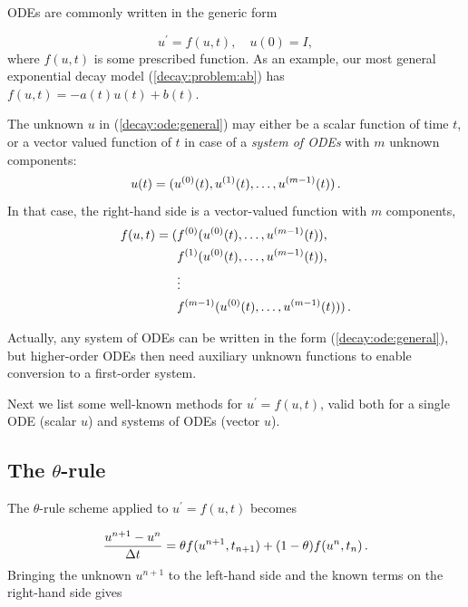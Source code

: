 \documentclass[%
oneside,                 %
final,                   %
10pt]{article}
\begin{document}
ODEs are commonly written in the generic form

\begin{equation}
u^{\prime} = f(u,t),\quad u(0)=I,
\label{decay:ode:general}
\end{equation}
where $f(u,t)$  is some prescribed function.
As an example, our most
general exponential decay model (\ref{decay:problem:ab}) has
$f(u,t)=-a(t)u(t) + b(t)$.

The unknown $u$ in (\ref{decay:ode:general}) may either be
a scalar function of time $t$, or a vector valued function of $t$ in
case of a \emph{system of ODEs} with $m$ unknown components:
\[ u(t) = (u^{(0)}(t),u^{(1)}(t),\ldots,u^{(m-1)}(t)) \thinspace .  \]
In that case, the right-hand side is a vector-valued function with $m$
components,
\begin{align*}
f(u, t) = ( & f^{(0)}(u^{(0)}(t),\ldots,u^{(m-1)}(t)),\\ 
            & f^{(1)}(u^{(0)}(t),\ldots,u^{(m-1)}(t)),\\ 
            & \vdots\\ 
            & f^{(m-1)}(u^{(0)}(t),\ldots,u^{(m-1)}(t)))
\thinspace .
\end{align*}

Actually, any system of ODEs can
be written in the form (\ref{decay:ode:general}), but higher-order
ODEs then need auxiliary unknown functions to enable conversion to
a first-order system.


Next we list some well-known methods for $u^{\prime}=f(u,t)$, valid both for
a single ODE (scalar $u$) and systems of ODEs (vector $u$).


\subsection{The $\theta$-rule}

The $\theta$-rule scheme applied to $u^{\prime}=f(u,t)$ becomes

\begin{equation}
\frac{u^{n+1}-u^n}{\Delta t} = \theta f(u^{n+1},t_{n+1}) +
(1-\theta)f(u^n, t_n)\thinspace .
\label{decay:fd2:theta}
\end{equation}
Bringing the unknown $u^{n+1}$ to the left-hand side and the known terms
on the right-hand side gives

   
\end{document}
